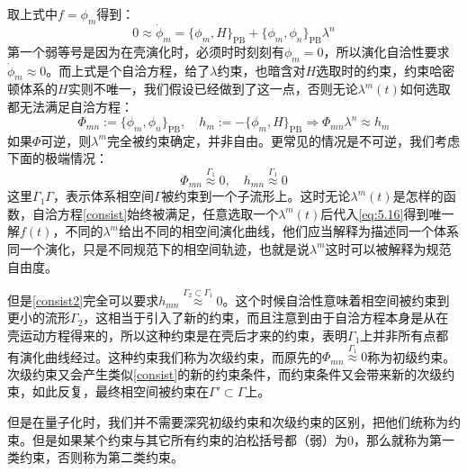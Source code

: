 取上式中$f=\phi_m$得到：
\begin{equation}
	\label{consist}
	0\approx\dot{\phi}_m=\{\phi_m,H\}_{\text{PB}}+\{\phi_m,\phi_n\}_{\text{PB}}\lambda^n
\end{equation}
第一个弱等号是因为在壳演化时，必须时时刻刻有$\phi_m = 0$，所以演化自洽性要求$\dot{\phi}_m\approx 0$。而上式是个自洽方程，给了$\lambda$约束，也暗含对$H$选取时的约束，约束哈密顿体系的$H$实则不唯一，我们假设已经做到了这一点，否则无论$\lambda^m(t)$如何选取都无法满足自洽方程：
\begin{equation}
	\Phi_{mn}:=\{\phi_m,\phi_n\}_{\text{PB}},\quad h_m:=-\{\phi_m,H\}_{\text{PB}}\Rightarrow \Phi_{mn}\lambda^n\approx h_m
\end{equation} 
如果$\Phi$可逆，则$\lambda^m$完全被约束确定，并非自由。更常见的情况是不可逆，我们考虑下面的极端情况：
\begin{equation}
	\label{consist2}
	\Phi_{mn}\overset{\Gamma_1}{\approx} 0,\quad h_{mn}\overset{\Gamma_1}{\approx} 0
\end{equation}
这里$\Gamma_1\Gamma$，表示体系相空间$\Gamma$被约束到一个子流形上。这时无论$\lambda^m(t)$是怎样的函数，自洽方程\ref{consist}始终被满足，任意选取一个$\lambda^m(t)$后代入\ref{eq:5.16}得到唯一解$f(t)$，不同的$\lambda^m$给出不同的相空间演化曲线，他们应当解释为描述同一个体系同一个演化，只是不同规范下的相空间轨迹，也就是说$\lambda^m$这时可以被解释为规范自由度。

但是\ref{consist2}完全可以要求$h_{mn}\overset{\Gamma_2\subset\Gamma_1}{\approx} 0$。这个时候自洽性意味着相空间被约束到更小的流形$\Gamma_2$，这相当于引入了新的约束，而且注意到由于自洽方程本身是从在壳运动方程得来的，所以这种约束是在壳后才来的约束，表明$\Gamma_1$上并非所有点都有演化曲线经过。这种约束我们称为次级约束，而原先的$\Phi_{mn}\overset{\Gamma_1}{\approx} 0$称为初级约束。次级约束又会产生类似\ref{consist}的新的约束条件，而约束条件又会带来新的次级约束，如此反复，最终相空间被约束在$\Gamma'\subset \Gamma$上。

但是在量子化时，我们并不需要深究初级约束和次级约束的区别，把他们统称为约束。但是如果某个约束与其它所有约束的泊松括号都（弱）为$0$，那么就称为第一类约束，否则称为第二类约束。
